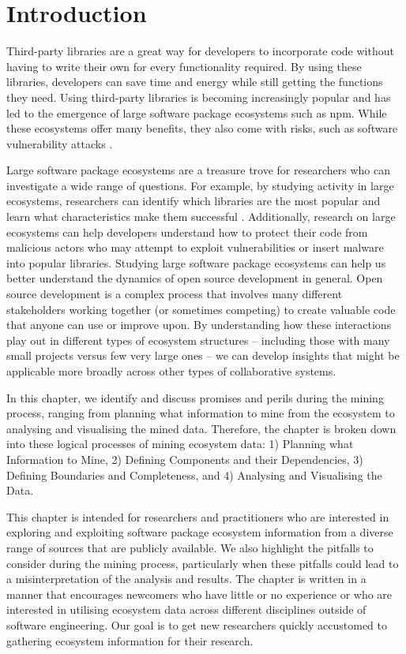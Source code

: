
\section{Introduction}
\label{PPM:sec:definition}

Third-party libraries are a great way for developers to incorporate code without having to write their own for every functionality required. By using these libraries, developers can save time and energy while still getting the functions they need.
Using third-party libraries is becoming increasingly popular and has led to the emergence of large software package ecosystems such as npm. While these ecosystems offer many benefits, they also come with risks, such as software vulnerability attacks \cite{Chinthanet:ASE2020}.

Large software package ecosystems are a treasure trove for researchers who can investigate a wide range of questions. For example, by studying activity in large ecosystems, researchers can identify which libraries are the most popular and learn what characteristics make them successful \cite{kikas.2017,decan:emse:2019}.
Additionally, research on large ecosystems can help developers understand how to protect their code from malicious actors who may attempt to exploit vulnerabilities or insert malware into popular libraries.
Studying large software package ecosystems can help us better understand the dynamics of open source development in general. Open source development is a complex process that involves many different stakeholders working together (or sometimes competing) to create valuable code that anyone can use or improve upon. By understanding how these interactions play out in different types of ecosystem structures -- including those with many small projects versus few very large ones -- we can develop insights that might be applicable more broadly across other types of collaborative systems.

In this chapter, we identify and discuss promises and perils during the mining process, ranging from planning what information to mine from the ecosystem to analysing and visualising the mined data. 
Therefore, the chapter is broken down into these logical processes of mining ecosystem data: 1) Planning what Information to Mine, 2) Defining Components and their Dependencies, 3) Defining Boundaries and Completeness, and 4) Analysing and Visualising the Data.

This chapter is intended for researchers and practitioners who are interested in exploring and exploiting software package ecosystem information from a diverse range of sources that are publicly available. 
We also highlight the pitfalls to consider during the mining process, particularly when these pitfalls could lead to a misinterpretation of the analysis and results. 
The chapter is written in a manner that encourages newcomers who have little or no experience or who are interested in utilising ecosystem data across different disciplines outside of software engineering.
Our goal is to get new researchers quickly accustomed to gathering ecosystem information for their research.


